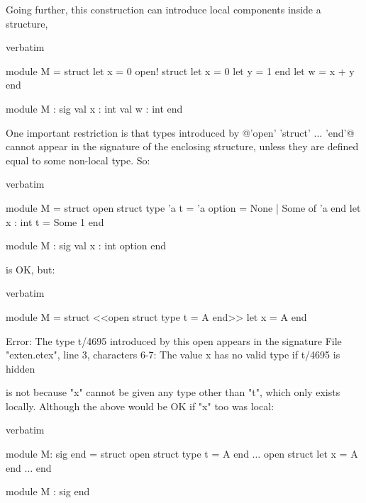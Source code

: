 {Going further, this construction can introduce local components inside a
structure,

\begin{camlexample}{verbatim}
\begin{caml}
\begin{camlinput}
module M = struct
  let x = 0
  open! struct
    let x = 0
    let y = 1
  end
  let w = x + y
end
\end{camlinput}
\begin{camloutput}
module M : sig val x : int val w : int end
\end{camloutput}
\end{caml}
\end{camlexample}

One important restriction is that types introduced by @'open' 'struct' ...
'end'@ cannot appear in the signature of the enclosing structure, unless they
are defined equal to some non-local type.
So:

\begin{camlexample}{verbatim}
\begin{caml}
\begin{camlinput}
module M = struct
  open struct type 'a t = 'a option = None | Some of 'a end
  let x : int t = Some 1
end
\end{camlinput}
\begin{camloutput}
module M : sig val x : int option end
\end{camloutput}
\end{caml}
\end{camlexample}
is OK, but:

\begin{camlexample}{verbatim}
\begin{caml}
\begin{camlinput}
module M = struct
  <<open struct type t = A end>>
  let x = A
end
\end{camlinput}
\begin{camlerror}
Error: The type t/4695 introduced by this open appears in the signature
       File "exten.etex", line 3, characters 6-7:
         The value x has no valid type if t/4695 is hidden
\end{camlerror}
\end{caml}
\end{camlexample}
is not because "x" cannot be given any type other than "t", which only exists
locally. Although the above would be OK if "x" too was local:

\begin{camlexample}{verbatim}
\begin{caml}
\begin{camlinput}
module M: sig end = struct
  open struct
  type t = A
  end
  $\ldots$
  open struct let x = A end
  $\ldots$
end
\end{camlinput}
\begin{camloutput}
module M : sig end
\end{camloutput}
\end{caml}
\end{camlexample}

}

